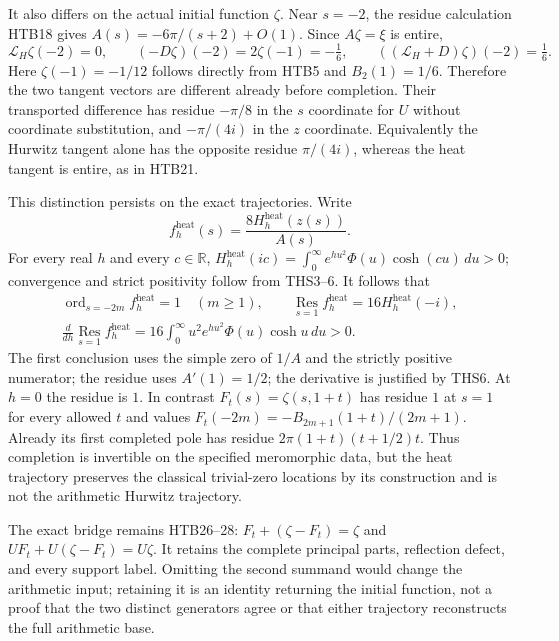 It also differs on the actual initial function $\zeta$. Near
$s=-2$, the residue calculation HTB18 gives
$A(s)=-6\pi/(s+2)+O(1)$. Since $A\zeta=\xi$ is entire,
\begin{equation}\tag{CFD19}
 \mathcal L_H\zeta(-2)=0,\qquad
 (-D\zeta)(-2)=2\zeta(-1)=-\tfrac16,\qquad
 ((\mathcal L_H+D)\zeta)(-2)=\tfrac16.
\end{equation}
Here $\zeta(-1)=-1/12$ follows directly from HTB5 and
$B_2(1)=1/6$. Therefore the two tangent vectors are different
already before completion. Their transported difference has
residue $-\pi/8$ in the $s$ coordinate for $U$ without coordinate
substitution, and $-\pi/(4i)$ in the $z$ coordinate. Equivalently
the Hurwitz tangent alone has the opposite residue $\pi/(4i)$,
whereas the heat tangent is entire, as in HTB21.

This distinction persists on the exact trajectories. Write
\begin{equation}\tag{CFD20}
 f_h^{\mathrm{heat}}(s)=\frac{8H_h^{\mathrm{heat}}(z(s))}{A(s)}.
\end{equation}
For every real $h$ and every $c\in\mathbb R$,
$H_h^{\mathrm{heat}}(ic)=\int_0^\infty
e^{hu^2}\Phi(u)\cosh(cu)\,du>0$; convergence and strict
positivity follow from THS3--6. It follows that
\begin{equation}\tag{CFD21}
\begin{gathered}
 \operatorname{ord}_{s=-2m}f_h^{\mathrm{heat}}=1\quad(m\ge1),
 \qquad
 \operatorname*{Res}_{s=1}f_h^{\mathrm{heat}}
                       =16H_h^{\mathrm{heat}}(-i),\\
 \frac{d}{dh}\operatorname*{Res}_{s=1}f_h^{\mathrm{heat}}
       =16\int_0^\infty u^2e^{hu^2}\Phi(u)\cosh u\,du>0.
\end{gathered}
\end{equation}
The first conclusion uses the simple zero of $1/A$ and the
strictly positive numerator; the residue uses $A'(1)=1/2$;
the derivative is justified by THS6. At $h=0$ the residue is
$1$. In contrast $F_t(s)=\zeta(s,1+t)$ has residue $1$ at
$s=1$ for every allowed $t$ and values
$F_t(-2m)=-B_{2m+1}(1+t)/(2m+1)$. Already its first completed
pole has residue $2\pi(1+t)(t+1/2)t$. Thus completion is
invertible on the specified meromorphic data, but the heat
trajectory preserves the classical trivial-zero locations by
its construction and is not the arithmetic Hurwitz trajectory.

The exact bridge remains HTB26--28:
$F_t+(\zeta-F_t)=\zeta$ and
$UF_t+U(\zeta-F_t)=U\zeta$. It retains the complete principal
parts, reflection defect, and every support label. Omitting the
second summand would change the arithmetic input; retaining it
is an identity returning the initial function, not a proof that
the two distinct generators agree or that either trajectory
reconstructs the full arithmetic base.

